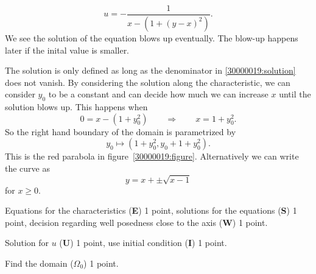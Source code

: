 \begin{loesung}
\begin{teilaufgaben}
\begin{equation}
u = -\frac{1}{x-(1+(y-x)^2)}.
\label{30000019:solution}
\end{equation}
We see the solution of the equation blows up eventually.
The blow-up happens later if the inital value is smaller.
\item
The solution is only defined as long as the denominator in
\eqref{30000019:solution}
does not vanish.
By considering the solution along the characteristic, we can consider $y_0$
to be a constant and can decide how much we can increase $x$ until the
solution blows up.
This happens when 
\[
0=x-(1+y_0^2)
\qquad\Rightarrow\qquad
x=1+y_0^2.
\]
So the right hand boundary of the domain is parametrized by
\[
y_0 \mapsto (1+y_0^2,y_0+1+y_0^2).
\]
This is the red parabola in figure~\ref{30000019:figure}.
Alternatively we can write the curve as 
\[
y=
x+
\pm
\sqrt{x-1}
\]
for $x\ge 0$.
\qedhere
\end{teilaufgaben}
\end{loesung}

\begin{bewertung}
\begin{teilaufgaben}
\item
Equations for the characteristics ({\bf E}) 1 point,
solutions for the equations ({\bf S}) 1 point,
decision regarding well posedness close to the axis ({\bf W}) 1 point.
\item
Solution for $u$ ({\bf U}) 1 point,
use initial condition ({\bf I}) 1 point.
\item
Find the domain ({\bf $\Omega_0$}) 1 point.
\end{teilaufgaben}
\end{bewertung}
